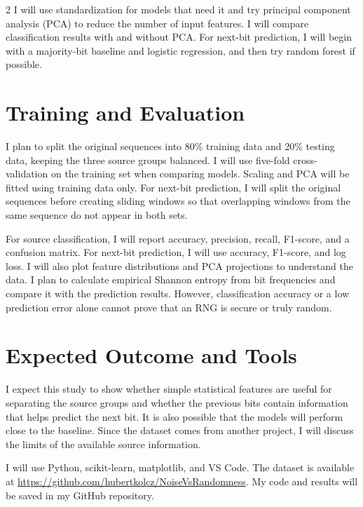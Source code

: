 \documentclass[11pt,letterpaper]{article}
\begin{document}
\begin{multicols}{2}
I will use standardization for models that need it and try principal component analysis (PCA) to reduce the number of input features. I will compare classification results with and without PCA. For next-bit prediction, I will begin with a majority-bit baseline and logistic regression, and then try random forest if possible.

\section{Training and Evaluation}
I plan to split the original sequences into 80\% training data and 20\% testing data, keeping the three source groups balanced. I will use five-fold cross-validation on the training set when comparing models. Scaling and PCA will be fitted using training data only. For next-bit prediction, I will split the original sequences before creating sliding windows so that overlapping windows from the same sequence do not appear in both sets.

For source classification, I will report accuracy, precision, recall, F1-score, and a confusion matrix. For next-bit prediction, I will use accuracy, F1-score, and log loss. I will also plot feature distributions and PCA projections to understand the data. I plan to calculate empirical Shannon entropy from bit frequencies and compare it with the prediction results. However, classification accuracy or a low prediction error alone cannot prove that an RNG is secure or truly random.

\section{Expected Outcome and Tools}
I expect this study to show whether simple statistical features are useful for separating the source groups and whether the previous bits contain information that helps predict the next bit. It is also possible that the models will perform close to the baseline. Since the dataset comes from another project, I will discuss the limits of the available source information.

I will use Python, scikit-learn, matplotlib, and VS Code. The dataset is available at \url{https://github.com/hubertkolcz/NoiseVsRandomness}. My code and results will be saved in my GitHub repository.

\end{multicols}
\end{document}
